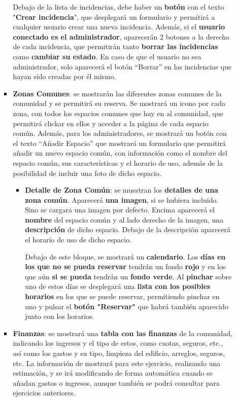 \begin{appendices}
\begin{itemize}
\begin{itemize}
\begin{itemize}
			Debajo de la lista de incidencias, debe haber un \textbf{botón} con el texto "\textbf{Crear incidencia}", que desplegará un formulario y permitirá a cualquier usuario crear una nueva incidencia. Además, si el \textbf{usuario conectado es el administrador}, aparecerán 2 botones a la derecha de cada incidencia, que permitirán tanto \textbf{borrar las incidencias} como \textbf{cambiar su estado}. En caso de que el usuario no sea administrador, solo aparecerá el botón ``Borrar'' en las incidencias que hayan sido creadas por él mismo.
			
			\item \textbf{Zonas Comunes}: se mostrarán las diferentes zonas comunes de la comunidad y se permitirá su reserva. Se mostrará un icono por cada zona, con todos los espacios comunes que hay en al comunidad, que permitirá clickar en ellos y acceder a la página de cada espacio común. Además, para los administradores, se mostrará un botón con el texto ``Añadir Espacio'' que mostrará un formulario que permitirá añadir un nuevo espacio común, con información como el nombre del espacio común, sus características y el horario de uso, además de la posibilidad de incluir una foto de dicho espacio.
			
			\begin{itemize}
				\item \textbf{Detalle de Zona Común}: se muestran los \textbf{detalles de una zona común}. Aparecerá \textbf{una imagen}, si se hubiera incluido. Sino se cargara una imagen por defecto. Encima aparecerá el \textbf{nombre} del espacio común y al lado derecho de la imagen, una \textbf{descripción} de dicho espacio. Debajo de la descripción aparecerá el horario de uso de dicho espacio.
				
				Debajo de este bloque, se mostrará un \textbf{calendario}. Los \textbf{días en los que no se pueda reservar} tendrán un fondo \textbf{rojo} y en los que aún \textbf{si se pueda} tendrán un \textbf{fondo verde}. Al \textbf{pinchar} sobre uno de estos días se desplegará una \textbf{lista con los posibles horarios} en los que se puede reservar, permitiendo pinchar en uno y pulsar el \textbf{botón "Reservar"} que habrá también aparecido junto con los horarios.
			\end{itemize}
			
			\item \textbf{Finanzas}: se mostrará una \textbf{tabla con las finanzas} de la comunidad, indicando los ingresos y el tipo de estos, como cuotas, seguros, etc., así como los gastos y su tipo, limpieza del edificio, arreglos, seguros, etc. La información de mostrará para este ejercicio, realizando una estimación, y se irá modificando de forma automática cuando se añadan gastos o ingresos, aunque también se podrá consultar para ejercicios anteriores. 
			

\end{itemize}
\end{itemize}
\end{itemize}
\end{appendices}
